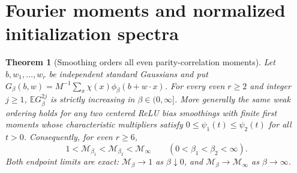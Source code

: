 \documentclass[11pt]{article}
\newtheorem{theorem}{Theorem}\newtheorem{lemma}[theorem]{Lemma}
\newcommand{\E}{\mathbb E}\newcommand{\R}{\mathbb R}
\begin{document}
\section{Fourier moments and normalized initialization spectra}
\begin{theorem}[Smoothing orders all even parity-correlation moments]
\label{thm:moment-order}
Let $b,w_1,\ldots,w_r$ be independent standard Gaussians and put
$G_\beta(b,w)=M^{-1}\sum_x\chi(x)\phi_\beta(b+w\cdot x)$.
For every even $r\ge2$ and integer $j\ge1$,
$\E G_\beta^{2j}$ is strictly increasing in
$\beta\in(0,\infty]$. More generally the same weak ordering holds
for any two centered ReLU bias smoothings with finite first moments whose characteristic
multipliers satisfy $0\le\psi_1(t)\le\psi_2(t)$ for all $t>0$.
Consequently, for even $r\ge6$,
\[
       1<\mathcal M_{\beta_1}<\mathcal M_{\beta_2}
                         <\mathcal M_\infty
            \qquad(0<\beta_1<\beta_2<\infty).          \tag{M1}
\]
Both endpoint limits are exact: $\mathcal M_\beta\to1$ as
$\beta\downarrow0$, and $\mathcal M_\beta\to\mathcal M_\infty$
as $\beta\to\infty$.
\end{theorem}
\end{document}
